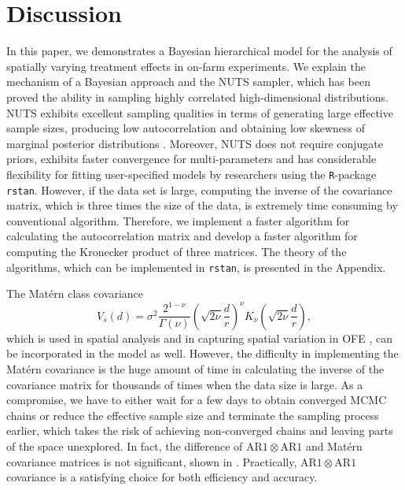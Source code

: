 \documentclass[a4paper]{article}   	%
\newcommand{\R}{\texttt{R}}
\newcommand{\rstan}{\texttt{rstan}}
\newcommand{\AR}{\mathrm{AR}1}
\newcommand{\Matern}{Mat\'ern }
\begin{document}
	
	\section{Discussion}
	
	In this paper, we demonstrates a Bayesian hierarchical model for the analysis of spatially varying treatment effects in on-farm experiments. We explain the mechanism of a Bayesian approach and the NUTS sampler, which has been proved the ability in sampling highly correlated high-dimensional distributions. NUTS exhibits excellent sampling qualities in terms of generating large effective sample sizes, producing low autocorrelation and obtaining low skewness of marginal posterior distributions \parencite{Nishio2019Performance}. Moreover, NUTS does not require conjugate priors, exhibits faster convergence for multi-parameters and has considerable flexibility for fitting user-specified models by researchers using the \R-package \rstan. However, if the data set is large, computing the inverse of the covariance matrix, which is three times the size of the data, is extremely time consuming by conventional algorithm. Therefore, we implement a faster algorithm for calculating the autocorrelation matrix and develop a faster algorithm for computing the Kronecker product of three matrices. The theory of the algorithms, which can be implemented in \rstan, is presented in the Appendix. 
	
	
	The \Matern class covariance 
	\begin{equation}\label{eq:matcov}
		V_s(d) = \sigma^2 \frac{2^{1-\nu}}{\Gamma(\nu)} \left( \sqrt{2\nu} \frac{d}{r}\right)^\nu K_\nu\left( \sqrt{2\nu} \frac{d}{r}\right),
	\end{equation}
	which is used in spatial analysis \parencite{Cressie1999Classes} and in capturing spatial variation in OFE \parencite{Selle2019Flexible}, can be incorporated in the model as well. %
	However, the difficulty in implementing the \Matern covariance is the huge amount of time in calculating the inverse of the covariance matrix for thousands of times when the data size is large. As a compromise, we have to either wait for a few days to obtain converged MCMC chains or reduce the effective sample size and terminate the sampling process earlier, which takes the risk of achieving non-converged chains and leaving parts of the space unexplored. In fact, the difference of $\AR\otimes\AR$ and \Matern covariance matrices is not significant, shown in \parencite{Selle2019Flexible}. Practically, $\AR\otimes\AR$ covariance is a satisfying choice for both efficiency and accuracy. 
	
\end{document}
